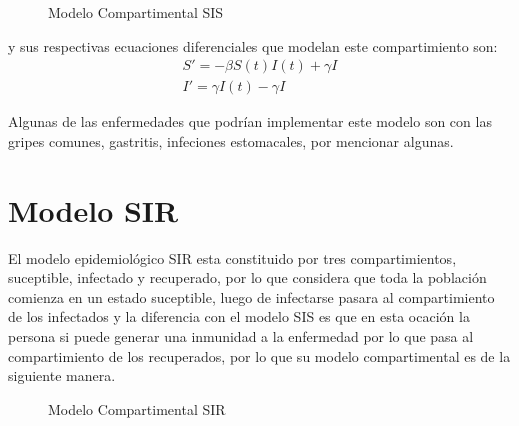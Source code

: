 \documentclass[a4paper,openany,12pt]{book}
\begin{document}
\begin{figure}[h]
\centering
{}
\caption{Modelo Compartimental SIS} \label{fig:Compartimento SIS}
\end{figure}	

y sus respectivas ecuaciones diferenciales que modelan este compartimiento son: 
\begin{align} 
S' =  -\beta S\left(t\right)I\left(t\right) + \gamma I \\
I'   = \gamma I\left(t\right) - \gamma I
\end{align}

Algunas de las enfermedades que podrían implementar este modelo son con las gripes comunes, gastritis, infeciones estomacales, por mencionar algunas.

\section{Modelo SIR}

El modelo epidemiológico SIR  esta constituido por tres compartimientos, suceptible, infectado y recuperado, por lo que considera que toda la población comienza en un estado suceptible, luego de infectarse pasara al compartimiento de los infectados y la diferencia con el modelo SIS es que en esta ocación la persona si puede generar una inmunidad a la enfermedad por lo que pasa al compartimiento de los recuperados, por lo que su modelo compartimental es de la siguiente manera.\\

\begin{figure}[h]
\centering
{}
\caption{Modelo Compartimental SIR} \label{fig:Compartimento SIR}
\end{figure}	
\end{document}
